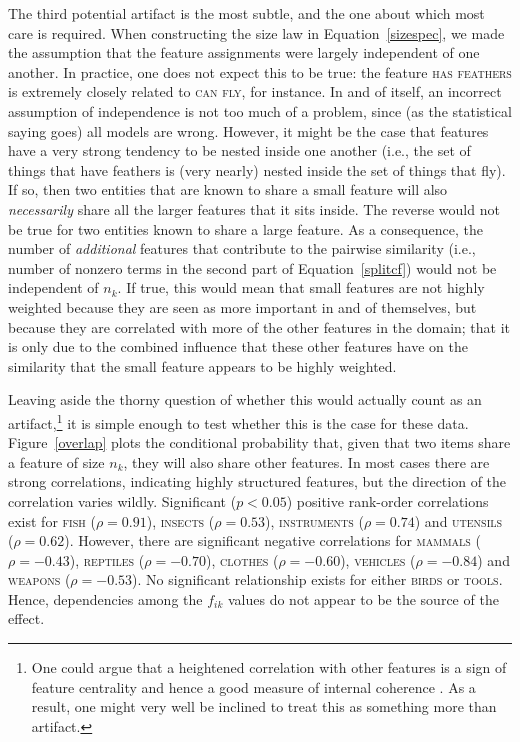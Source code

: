 \documentclass{apa}
\newcommand{\feature}[1]{\textsc{#1}}
\newcommand{\domain}[1]{\textsc{#1}}
\begin{document}
The third potential artifact is the most subtle, and the one about which most care is required. When constructing the size law in Equation~\ref{sizespec}, we made the assumption that the feature assignments were largely independent of one another. In practice, one does not expect this to be true: the feature \feature{has feathers} is extremely closely related to \feature{can fly}, for instance. In and of itself, an incorrect assumption of independence is not too much of a problem, since (as the statistical saying goes) all models are wrong. However, it might be the case that features have a very strong tendency to be nested inside one another (i.e., the set of things that have feathers is (very nearly) nested inside the set of things that fly). If so, then two entities that are known to share a small feature will also {\it necessarily} share all the larger features that it sits inside. The reverse would not be true for two entities known to share a large feature. As a consequence, the number of {\it additional} features that contribute to the pairwise similarity (i.e., number of nonzero terms in the second part of Equation~\ref{splitcf}) would not be independent of $n_k$. If true, this would mean that small features are not highly weighted because they are seen as more important in and of themselves, but because they are correlated with more of the other features in the domain; that it is only due to the combined influence that these other features have on the similarity that the small feature appears to be highly weighted.

Leaving aside the thorny question of whether this would actually count as an artifact,\footnote{One could argue that a heightened correlation with other features is a sign of feature centrality \cite{Sloman1998a} and hence a good measure of internal coherence \cite{Rogers2004}. As a result, one might very well be inclined to treat this as something more than artifact.} it is simple enough to test whether this is the case for these data. Figure~\ref{overlap} plots the conditional probability that, given that two items share a feature of size $n_k$, they will also share other features. In most cases there are strong correlations, indicating highly structured features, but the direction of the correlation varies wildly. Significant ($p<0.05$) positive rank-order correlations exist for \domain{fish} ($\rho=0.91$), \domain{insects} ($\rho=0.53$), \domain{instruments} ($\rho=0.74$) and \domain{utensils} ($\rho=0.62$). However, there are significant negative correlations for \domain{mammals} ($\rho=-0.43$), \domain{reptiles} ($\rho=-0.70$), \domain{clothes} ($\rho=-0.60$), \domain{vehicles} ($\rho=-0.84$) and \domain{weapons} ($\rho=-0.53$). No significant relationship exists for either \domain{birds} or \domain{tools}. Hence, dependencies among the $f_{ik}$ values do not appear to be the source of the effect.
\end{document}
